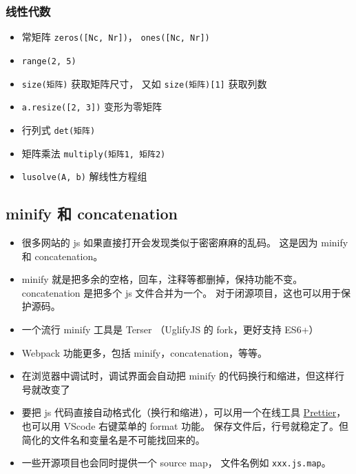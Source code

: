 \subsubsection{线性代数}
\begin{itemize}
\item 常矩阵 \verb|zeros([Nc, Nr])|， \verb|ones([Nc, Nr])|
\item \verb|range(2, 5)|
\item \verb|size(矩阵)| 获取矩阵尺寸， 又如 \verb|size(矩阵)[1]| 获取列数
\item \verb|a.resize([2, 3])| 变形为零矩阵
\item 行列式 \verb|det(矩阵)|
\item 矩阵乘法 \verb|multiply(矩阵1, 矩阵2)|
\item \verb|lusolve(A, b)| 解线性方程组
\end{itemize}

\subsection{minify 和 concatenation}
\begin{itemize}
\item 很多网站的 js 如果直接打开会发现类似于密密麻麻的乱码。 这是因为 minify 和 concatenation。
\item minify 就是把多余的空格，回车，注释等都删掉，保持功能不变。 concatenation 是把多个 js 文件合并为一个。 对于闭源项目，这也可以用于保护源码。
\item 一个流行 minify 工具是 Terser （UglifyJS 的 fork，更好支持 ES6+）
\item Webpack 功能更多，包括 minify，concatenation，等等。
\item 在浏览器中调试时，调试界面会自动把 minify 的代码换行和缩进，但这样行号就改变了
\item 要把 js 代码直接自动格式化（换行和缩进），可以用一个在线工具 \href{https://prettier.io/playground/}{Prettier}，也可以用 VScode 右键菜单的 format 功能。 保存文件后，行号就稳定了。但简化的文件名和变量名是不可能找回来的。
\item 一些开源项目也会同时提供一个 source map， 文件名例如 \verb`xxx.js.map`。
\end{itemize}

